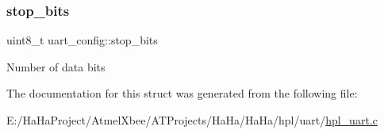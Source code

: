 \subsubsection{\texorpdfstring{stop\+\_\+bits}{stop\_bits}}
{\footnotesize\ttfamily uint8\+\_\+t uart\+\_\+config\+::stop\+\_\+bits}

Number of data bits 

The documentation for this struct was generated from the following file\+:\begin{DoxyCompactItemize}
\item 
E\+:/\+Ha\+Ha\+Project/\+Atmel\+Xbee/\+A\+T\+Projects/\+Ha\+Ha/\+Ha\+Ha/hpl/uart/\hyperlink{hpl__uart_8c}{hpl\+\_\+uart.\+c}\end{DoxyCompactItemize}
